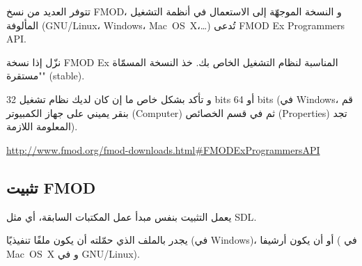 تتوفر العديد من نسخ
\textenglish{FMOD}،
و النسخة الموجهّة إلى الاستعمال في أنظمة التشغيل المألوفة
(\mbox{\textenglish{GNU/Linux}}، \textenglish{Windows}، \mbox{\textenglish{Mac OS X}}،\dots)
تُدعى
\textenglish{FMOD Ex Programmers API}.

نزّل إذا نسخة
\textenglish{FMOD Ex}
المناسبة لنظام التشغيل الخاص بك. خذ النسخة المسمّاة "مستقرة"
(\textenglish{stable}).

و تأكد بشكل خاص ما إن كان لديك نظام تشغيل
\textenglish{32 bits}
أو
\textenglish{64 bits}
(في
\textenglish{Windows}،
 قم بنقر يميني على جهاز الكمبيوتر
(\textenglish{Computer})
ثم في قسم الخصائص
(\textenglish{Properties})
تجد المعلومة اللازمة).

\url{http://www.fmod.org/fmod-downloads.html#FMODExProgrammersAPI}

\subsection{تثبيت \textenglish{FMOD}}

يعمل التثبيت بنفس مبدأ عمل المكتبات السابقة، أي مثل \textenglish{SDL}.

يجدر بالملف الذي حمّلته أن يكون ملفًا تنفيذيًا (في
\textenglish{Windows})،
 أو أن يكون أرشيفا 
(
في
\mbox{\textenglish{Mac OS X}}
و
في
\mbox{\textenglish{GNU/Linux}}).

